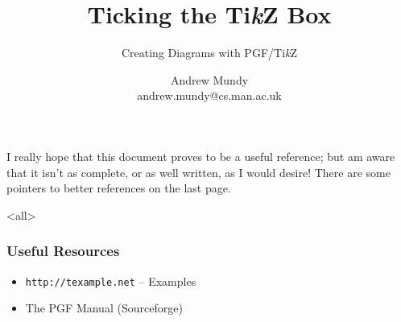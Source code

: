 \title{Ticking the Ti\emph{k}Z Box}
\subtitle{Creating Diagrams with PGF/Ti\emph{k}Z}
\author{Andrew Mundy\\andrew.mundy@cs.man.ac.uk}
\date{}

\usepackage{tikz}
\usetikzlibrary{automata,chains,scopes,patterns,petri}

\usepackage{etoolbox}

\usepackage{subcaption}

\lstset{
	frame = tb,
	columns = fullflexible,
}


	\maketitle
	\begin{frame}
		\titlepage
	\end{frame}

	I really hope that this document proves to be a useful reference; but am aware that it isn't as complete, or as well written, as I would desire!
	There are some pointers to better references on the last page.

	\mode<all>
		
		
		\appendix
		
	\mode*

	\begin{frame}
		\frametitle{Useful Resources}
		\begin{itemize}
			\item\texttt{http://texample.net} -- Examples
			\item The PGF Manual (Sourceforge)
		\end{itemize}
	\end{frame}

